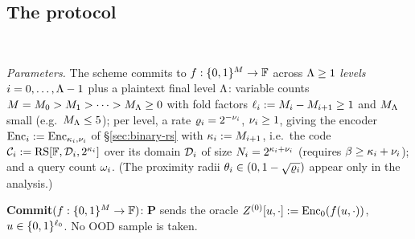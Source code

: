 \subsection{The protocol}\label{sec:protocol}

\begin{protocol}\label{fig:protocol}
\ \par\smallskip
\emph{Parameters.} The scheme commits to $f : \{0,1\}^{M} \to \mathbb{F}$ across $\Lambda \ge 1$ \emph{levels} $i = 0, \dots, \Lambda-1$ plus a plaintext final level $\Lambda$: variable counts $M = M_0 > M_1 > \dots > M_\Lambda \ge 0$ with fold factors $\ell_i := M_i - M_{i+1} \ge 1$ and $M_\Lambda$ small (e.g.\ $M_\Lambda \le 5$); per level, a rate $\varrho_i = 2^{-\nu_i}$, $\nu_i \ge 1$, giving the encoder $\mathrm{Enc}_i := \mathrm{Enc}_{\kappa_i, \nu_i}$ of \S\ref{sec:binary-rs} with $\kappa_i := M_{i+1}$, i.e.\ the code $\mathcal{C}_i := \mathrm{RS}[\mathbb{F}, \mathcal{D}_i, 2^{\kappa_i}]$ over its domain $\mathcal{D}_i$ of size $N_i = 2^{\kappa_i + \nu_i}$ (requires $\beta \ge \kappa_i + \nu_i$); and a query count $\omega_i$. (The proximity radii $\theta_i \in (0, 1 - \sqrt{\varrho_i})$ appear only in the analysis.)

\smallskip
\textbf{Commit}$(f : \{0,1\}^{M} \to \mathbb{F})$: $\mathbf{P}$ sends the oracle $Z^{(0)}[u, \cdot] := \mathrm{Enc}_0(f(u, \cdot))$, $u \in \{0,1\}^{\ell_0}$. No OOD sample is taken.


\end{protocol}
